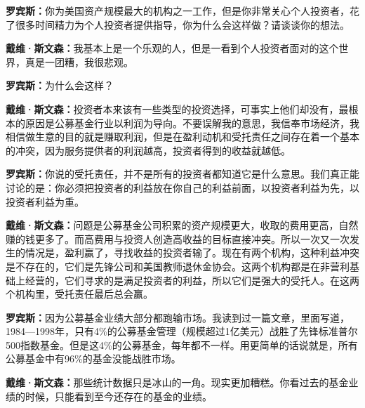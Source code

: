 \begin{BookQuote}
\textbf{罗宾斯：}你为美国资产规模最大的机构之一工作，但是你非常关心个人投资者，花了很多时间精力为个人投资者提供指导，你为什么会这样做？请谈谈你的想法。
\end{BookQuote}

\begin{BookQuote}
\textbf{戴维·斯文森：}我基本上是一个乐观的人，但是一看到个人投资者面对的这个世界，真是一团糟，我很悲观。
\end{BookQuote}

\begin{BookQuote}
\textbf{罗宾斯：}为什么会这样？
\end{BookQuote}

\begin{BookQuote}
\textbf{戴维·斯文森：}投资者本来该有一些类型的投资选择，可事实上他们却没有，最根本的原因是公募基金行业以利润为导向。不要误解我的意思，我信奉市场经济，我相信做生意的目的就是赚取利润，但是在盈利动机和受托责任之间存在着一个基本的冲突，因为服务提供者的利润越高，投资者得到的收益就越低。
\end{BookQuote}

\begin{BookQuote}
\textbf{罗宾斯：}你说的受托责任，并不是所有的投资者都知道它是什么意思。我们真正能讨论的是：你必须把投资者的利益放在你自己的利益前面，以投资者利益为先，以投资者利益为重。
\end{BookQuote}

\begin{BookQuote}
\textbf{戴维·斯文森：}问题是公募基金公司积累的资产规模更大，收取的费用更高，自然赚的钱更多了。而高费用与投资人创造高收益的目标直接冲突。所以一次又一次发生的情况是，盈利赢了，寻找收益的投资者输了。现在有两个机构，这种利益冲突是不存在的，它们是先锋公司和美国教师退休金协会。这两个机构都是在非营利基础上经营的，它们寻求的是满足投资者的利益，所以它们是强大的受托人。在这两个机构里，受托责任最后总会赢。
\end{BookQuote}

\begin{BookQuote}
\textbf{罗宾斯：}因为公募基金业绩大部分都跑输市场。我读到过一篇文章，里面写道，1984—1998年，只有4\%的公募基金管理（规模超过1亿美元）战胜了先锋标准普尔500指数基金。但是这4\%的公募基金，每年都不一样。用更简单的话说就是，所有公募基金中有96\%的基金没能战胜市场。
\end{BookQuote}

\begin{BookQuote}
\textbf{戴维·斯文森：}那些统计数据只是冰山的一角。现实更加糟糕。你看过去的基金业绩的时候，只能看到至今还存在的基金的业绩。
\end{BookQuote}

